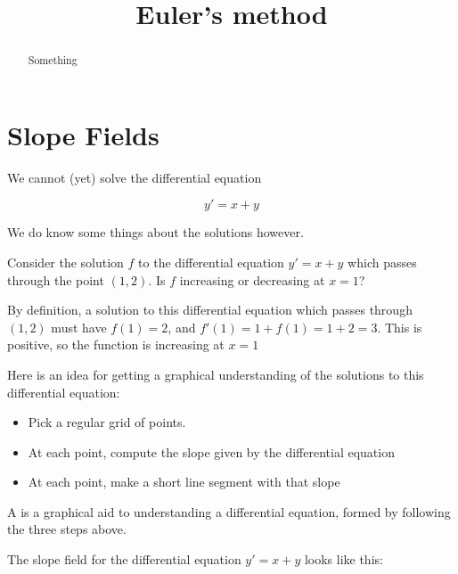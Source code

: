 \documentclass{ximera}
\title[Dig-In:]{Euler's method}
\begin{document}
\begin{abstract}
Something
\end{abstract}
\maketitle


\section{Slope Fields}

We cannot (yet) solve the differential equation

\[
y' = x+y
\]

We do know some things about the solutions however.

\begin{question}
	Consider the solution $f$ to the differential equation $y'=x+y$ which passes through the point $(1,2)$.   Is $f$ increasing or decreasing at $x=1$?
	
	\begin{multipleChoice}
	\end{multipleChoice}
	
	\begin{hint}
		By definition, a solution to this differential equation which passes through $(1,2)$ must have $f(1)=2$, and $f'(1) = 1+f(1) = 1+2=3$.  
		This is positive, so the function is increasing at $x=1$
	\end{hint}
\end{question}

Here is an idea for getting a graphical understanding of the solutions to this differential equation:

\begin{itemize}
	\item Pick a regular grid of points.
	\item At each point, compute the slope given by the differential equation
	\item At each point, make a short line segment with that slope
\end{itemize}

\begin{definition}
	A  is a graphical aid to understanding a differential equation, formed by following the three steps above.
\end{definition}

The slope field for the differential equation $y' = x+y$ looks like this:
\end{document}
